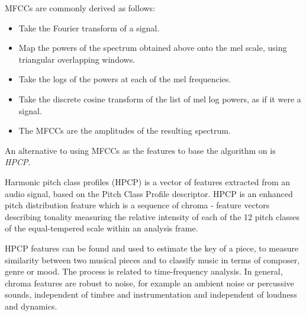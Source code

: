 MFCCs are commonly derived as follows:
\begin{itemize}
\item Take the Fourier transform of a signal.
\item Map the powers of the spectrum obtained above onto the mel scale, using triangular overlapping windows.
\item Take the logs of the powers at each of the mel frequencies.
\item Take the discrete cosine transform of the list of mel log powers, as if it were a signal.
\item The MFCCs are the amplitudes of the resulting spectrum.
\end{itemize}

An alternative to using MFCCs as the features to base the algorithm on is \textit{HPCP}.

Harmonic pitch class profiles (HPCP) is a vector of features extracted from an audio signal, based on the Pitch Class Profile descriptor. HPCP is an enhanced pitch distribution feature which is a sequence of chroma - feature vectors describing tonality measuring the relative intensity of each of the 12 pitch classes of the equal-tempered scale within an analysis frame. 

HPCP features can be found and used to estimate the key of a piece, to measure similarity between two musical pieces and to classify music in terms of composer, genre or mood. The process is related to time-frequency analysis. In general, chroma features are robust to noise, for example an ambient noise or percussive sounds, independent of timbre and instrumentation and independent of loudness and dynamics.


